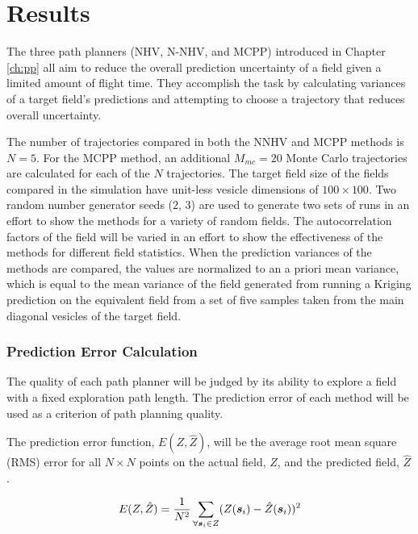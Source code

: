 \chapter{Results}
The three path planners (NHV, N-NHV, and MCPP) introduced in Chapter \ref{ch:pp} all aim to reduce the overall prediction uncertainty of a field given a limited amount of flight time. They accomplish the task by calculating variances of a target field's predictions and attempting to choose a trajectory that reduces overall uncertainty. 

The number of trajectories compared in both the NNHV and MCPP methods is $N=5$. For the MCPP method, an additional $M_{mc}=20$ Monte Carlo trajectories are calculated for each of the $N$ trajectories. The target field size of the fields compared in the simulation have unit-less vesicle dimensions of $100\times 100$. Two random number generator seeds ($2$, $3$) are used to generate two sets of runs in an effort to show the methods for a variety of random fields. The autocorrelation factors of the field will be varied in an effort to show the effectiveness of the methods for different field statistics. When the prediction variances of the methods are compared, the values are normalized to an a priori mean variance, which is equal to the mean variance of the field generated from running a Kriging prediction on the equivalent field from a set of five samples taken from the main diagonal vesicles of the target field.

\subsection{Prediction Error Calculation}
The quality of each path planner will be judged by its ability to explore a field with a fixed exploration path length. The prediction error of each method will be used as a criterion of path planning quality.

The prediction error function, $E (Z,\hat{Z})$, will be the average root mean square (RMS) error for all $N\times N$ points on the actual field, $Z$, and the predicted field, $\hat{Z}$.

\begin{equation}
E (Z, \hat{Z}) = \frac{1}{N^2}\sum_{\forall {\it{\boldsymbol{s}}}_i \in Z} (Z({\it{\boldsymbol{s}}}_i) - \hat{Z}({\it{\boldsymbol{s}}}_i))^2
\end{equation}




